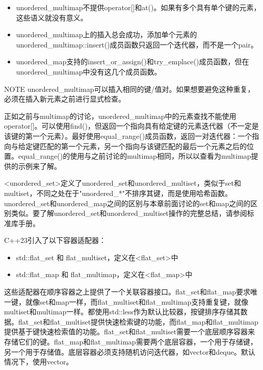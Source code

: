 \begin{itemize}
\item
unordered\_multimap不提供operator[]和at()。如果有多个具有单个键的元素，这些语义就没有意义。

\item
unordered\_multimap上的插入总会成功，添加单个元素的unordered\_multimap::insert()成员函数只返回一个迭代器，而不是一个pair。

\item
unordered\_map支持的insert\_or\_assign()和try\_emplace()成员函数，但在unordered\_multimap中没有这几个成员函数。
\end{itemize}

\begin{myNotic}{NOTE}
unordered\_multimap可以插入相同的键/值对。如果想要避免这种重复，必须在插入新元素之前进行显式检查。
\end{myNotic}

正如之前与multimap的讨论，unordered\_multimap中的元素查找不能使用operator[]。可以使用find()，但返回一个指向具有给定键的元素迭代器（不一定是该键的第一个元素）。最好使用equal\_range()成员函数，返回一对迭代器：一个指向与给定键匹配的第一个元素，另一个指向与该键匹配的最后一个元素之后的位置。equal\_range()的使用与之前讨论的multimap相同，所以以查看为multimap提供的示例来了解。


<unordered\_set>定义了unordered\_set和unordered\_multiset，类似于set和multiset，不同之处在于"unordered\_*"不排序其键，而是使用哈希函数。unordered\_set和unordered\_map之间的区别与本章前面讨论的set和map之间的区别类似。要了解unordered\_set和unordered\_multiset操作的完整总结，请参阅标准库手册。



C++23引入了以下容器适配器：

\begin{itemize}
\item
std::flat\_set 和 flat\_multiset，定义在<flat\_set>中

\item
std::flat\_map 和 flat\_multimap，定义在<flat\_map>中
\end{itemize}

这些适配器在顺序容器之上提供了一个关联容器接口。flat\_set和flat\_map要求唯一键，就像set和map一样，而flat\_multiset和flat\_multimap支持重复键，就像multiset和multimap一样。都使用std::less作为默认比较器，按键排序存储其数据。flat\_set和flat\_multiset提供快速检索键的功能，而flat\_map和flat\_multimap提供基于键快速检索值的功能。flat\_set和flat\_multiset需要一个底层顺序容器来存储它们的键。flat\_map和flat\_multimap需要两个底层容器，一个用于存储键，另一个用于存储值。底层容器必须支持随机访问迭代器，如vector和deque。默认情况下，使用vector。

